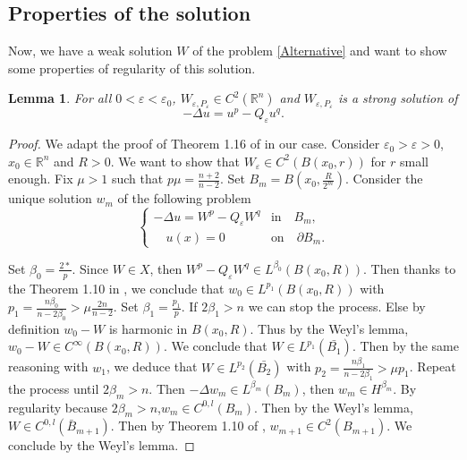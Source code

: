 \documentclass[12pt]{amsart}
\theoremstyle{plain}
\newtheorem{lemma}[theorem]{Lemma}       %
\theoremstyle{definition}
\theoremstyle{remark}
\renewcommand{\epsilon}{\varepsilon}
\begin{document}
\subsection{Properties of the solution}
Now, we have a weak solution $W$ of the problem \eqref{Alternative} and want to show some properties of regularity of this solution. 
\begin{lemma}\label{regularity2}
For all $0<\epsilon<\epsilon_0$, $W_{\epsilon,P_{\epsilon}}\in C^2(\mathbb{R}^n)$ and $W_{\epsilon,P_{\epsilon}}$ is a strong solution of
$$-\Delta u = u^p-Q_{\epsilon}u^q.$$
\end{lemma}


\begin{proof}
We adapt the proof of Theorem 1.16 of \cite{AmbrosettiMalchiodi2007} in our case. Consider $\epsilon_0>\epsilon >0$, $x_0 \in \mathbb{R}^n$ and $R>0$. We want to show that $W_{\epsilon} \in C^2(B(x_0,r))$ for $r$ small enough. Fix $\mu>1$ such that $p\mu=\frac{n+2}{n-2}$. Set $B_m=B(x_0,\frac{R}{2^m})$. Consider the unique solution $w_m$ of the following problem  
\begin{equation*}
 \begin{cases} 
  -\Delta u=W^p-Q_{\epsilon}W^q&\text{in} \quad B_m, \\
        
        \quad u(x) = 0 &\text{on} \quad  \partial B_m.     
\end{cases}
\end{equation*} 

Set $\beta_0 =\frac{2*}{p}$. Since $W\in X$, then $W^p - Q_{\epsilon}W^q\in L^{\beta_0}(B(x_0,R))$. Then thanks to the Theorem 1.10 in \cite{AmbrosettiMalchiodi2007}, we conclude that $w_0\in L^{p_1}(B(x_0,R))$  with $p_1=\frac{n\beta_0}{n-2\beta_0}> \mu\frac{2n}{n-2}$. Set $\beta_1 =\frac{p_1}{p}$. If $2\beta_1>n$ we can stop the process. Else by definition $w_0-W$ is harmonic in $B(x_0,R)$. Thus by the Weyl's lemma, $w_0-W\in C^{\infty}(B(x_0,R))$. We conclude that $W\in L^{p_1}(\bar{B_1})$. Then by the same reasoning with $w_1$, we deduce that $W\in L^{p_2}(\bar{B_2})$ with $p_2=\frac{n\beta_1}{n-2\beta_1}> \mu p_1$. Repeat the process until $2\beta_m> n$. Then $-\Delta w_m\in L^{\beta_m}(B_m)$, then $w_m \in H^{\beta_m}$. By regularity because $2\beta_m>n$,$ w_m \in C^{0,l}(B_m)$. Then by the Weyl's lemma, $W\in C^{0,l}(\bar{B}_{m+1})$. Then by Theorem 1.10 of \cite{AmbrosettiMalchiodi2007}, $w_{m+1} \in C^2(B_{m+1})$. We conclude by the Weyl's lemma.  
\end{proof}
\end{document}
